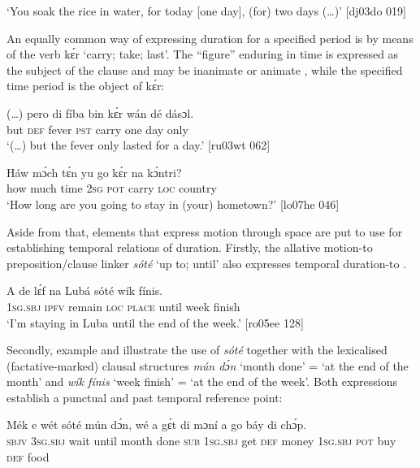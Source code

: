 \glt ‘You soak the rice in water, for today [one day], (for) two days (…)’ [dj03do 019]
\z

An equally common way of expressing duration for a specified period is by means of the verb kɛ́r ‘carry; take; last’. The “figure” enduring in time is expressed as the subject of the clause and may be inanimate  or animate , while the specified time period is the object of kɛ́r: 


\ea%
    \label{ex:key:1024}
    \gll (…)  pero  di  fíba    bin  kɛ́r    wán    dé  dásɔl.\\
{}  but    \textsc{def}  fever  \textsc{pst}  carry  one    day  only\\

\glt ‘(…) but the fever only lasted for a day.’ [ru03wt 062]
\z


\ea%
    \label{ex:key:1025}
    \gll Háw  mɔ́ch  tɛ́n    yu  go  kɛ́r    na  kɔ́ntri?\\
how    much  time    \textsc{2sg}  \textsc{pot}  carry  \textsc{loc}  country\\

\glt ‘How long are you going to stay in (your) hometown?’ [lo07he 046]
\z

Aside from that, elements that express motion through space are put to use for establishing temporal relations of duration. Firstly, the allative motion{}-to preposition/clause linker \textit{sóté} ‘up to; until’ also expresses temporal duration-to . 


\ea%
    \label{ex:key:1026}
    \gll A    de  lɛ́f    na  Lubá  sóté    wík    fínis.\\
\textsc{1sg.sbj}  \textsc{ipfv}  remain  \textsc{loc}  \textsc{place}  until  week  finish\\

\glt ‘I’m staying in Luba until the end of the week.’ [ro05ee 128]
\z

Secondly, example  and  illustrate the use of \textit{sóté} together with the lexicalised (factative-marked) clausal structures \textit{mún dɔ́n} ‘month done’ = ‘at the end of the month’ and \textit{wík fínis} ‘week finish’ = ‘at the end of the week’. Both expressions establish a punctual and past temporal reference point:


\ea%
    \label{ex:key:1027}
    \gll Mék  e    wét    sóté    mún  dɔ́n,    wé  a    gɛ́t
di  mɔní  a    go  báy  di  chɔ́p.\\
\textsc{sbjv}  \textsc{3sg.sbj}  wait    until  month  done  \textsc{sub}  \textsc{1sg.sbj}  get
\textsc{def}  money  \textsc{1sg.sbj}  \textsc{pot}  buy  \textsc{def}  food\\

